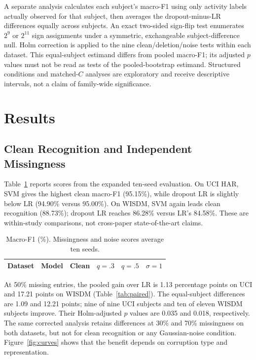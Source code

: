 \documentclass[conference]{IEEEtran}
\begin{document}
A separate analysis calculates each subject's macro-F1 using only activity labels actually observed for that subject, then averages the dropout-minus-LR differences equally across subjects. An exact two-sided sign-flip test enumerates $2^9$ or $2^{11}$ sign assignments under a symmetric, exchangeable subject-difference null. Holm correction is applied to the nine clean/deletion/noise tests within each dataset. This equal-subject estimand differs from pooled macro-F1; its adjusted $p$ values must not be read as tests of the pooled-bootstrap estimand. Structured conditions and matched-$C$ analyses are exploratory and receive descriptive intervals, not a claim of family-wide significance.

\section{Results}
\subsection{Clean Recognition and Independent Missingness}
Table~\ref{tab:main} reports scores from the expanded ten-seed evaluation. On UCI HAR, SVM gives the highest clean macro-F1 (95.15\%), while dropout LR is slightly below LR (94.90\% versus 95.00\%). On WISDM, SVM again leads clean recognition (88.73\%); dropout LR reaches 86.28\% versus LR's 84.58\%. These are within-study comparisons, not cross-paper state-of-the-art claims.

\begin{table}[t]
\caption{Macro-F1 (\%). Missingness and noise scores average ten seeds.}
\label{tab:main}\centering\footnotesize
\setlength{\tabcolsep}{3pt}
\begin{tabular}{llrrrr}\toprule
Dataset & Model & Clean & $q=.3$ & $q=.5$ & $\sigma=1$ \\\midrule

\end{tabular}
\end{table}

At 50\% missing entries, the pooled gain over LR is 1.13 percentage points on UCI and 17.21 points on WISDM (Table~\ref{tab:paired}). The equal-subject differences are 1.09 and 12.21 points; nine of nine UCI subjects and ten of eleven WISDM subjects improve. Their Holm-adjusted $p$ values are 0.035 and 0.018, respectively. The same corrected analysis retains differences at 30\% and 70\% missingness on both datasets, but not for clean recognition or any Gaussian-noise condition. Figure~\ref{fig:curves} shows that the benefit depends on corruption type and representation.
\end{document}
